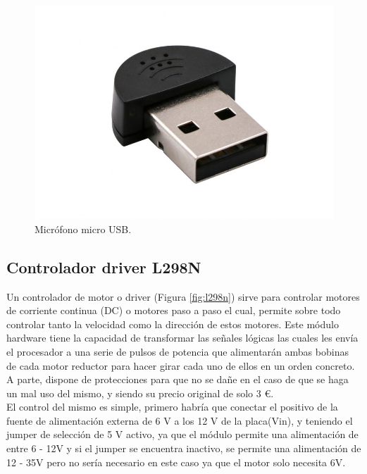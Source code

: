 \begin{figure}[H] %
  \begin{center}
    \includegraphics[scale=0.3]{figs/microfono-usb}
  \end{center}
  \caption{Micrófono micro USB.}
  \label{fig:microfono-usb}
\end{figure}


\subsection{Controlador driver L298N}
\label{subsec:l298n}

Un controlador de motor o driver (Figura \ref{fig:l298n}) sirve para controlar motores de corriente continua (DC) o motores paso a paso el cual, permite sobre todo controlar tanto la velocidad como la dirección de estos motores. Este módulo hardware tiene la capacidad de transformar las señales lógicas las cuales les envía el procesador a una serie de pulsos de potencia que alimentarán ambas bobinas de cada motor reductor para hacer girar cada uno de ellos en un orden concreto. A parte, dispone de protecciones para que no se dañe en el caso de que se haga un mal uso del mismo, y siendo su precio original de solo 3 \euro.\\ 

El control del mismo es simple, primero habría que conectar el positivo de la fuente de alimentación externa de 6 V a los 12 V de la placa(Vin), y teniendo el jumper de selección de 5 V activo, ya que el módulo permite una alimentación de entre 6 - 12V y si el jumper se encuentra inactivo, se permite una alimentación de 12 - 35V pero no sería necesario en este caso ya que el motor solo necesita 6V. \\

